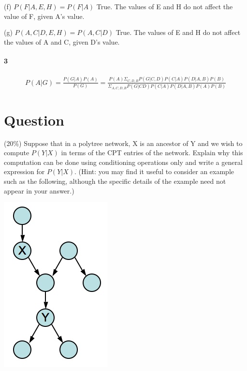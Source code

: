 \documentclass[10pt]{article}
\begin{document}
      (f)	$P(F|A,E,H) = P(F|A)$ True. The values of E and H do not affect the value of F, given A's value.

      (g)	$P(A,C|D,E,H) = P(A,C|D)$ True. The values of E and H do not affect the values of A and C, given D's value.

\paragraph{3} 
\begin{equation}
\begin{split}
P(A|G) = \frac{P(G|A)P(A)}{P(G)} 
= \frac{P(A)\Sigma_{C,D,B}P(G|C,D)P(C|A)P(D|A,B)P(B)}{\Sigma_{A,C,D,B} P(G|CD)P(C|A)P(D|A,B)P(A)P(B)}
\end{split}
\end{equation}

\section{Question}
 (20\%) Suppose that in a polytree network, X is an ancestor of Y and we wish to compute $P(Y|X)$ in terms of the CPT entries of the network. Explain why this computation can be done using conditioning operations only and write a general expression for $P(Y|X)$. (Hint: you may find it useful to consider an example such as the following, although the specific details of the example need not appear in your answer.)

\begin{center}
 \includegraphics[scale=0.5]{hw4_files/hw4f2.jpg}
\end{center}
\end{document}
